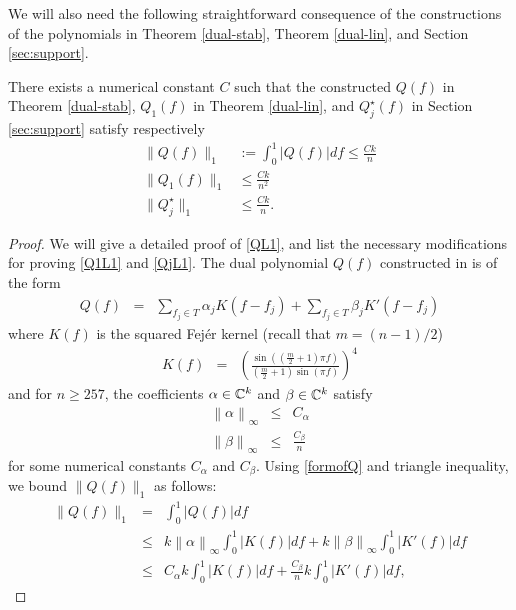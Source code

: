 We will also need the following straightforward consequence of the constructions of the polynomials in Theorem \ref{dual-stab}, Theorem \ref{dual-lin}, and Section \ref{sec:support}.
\begin{lemma}
\label{l1}
There exists a numerical constant $C$ such that the constructed $Q(f)$ in Theorem \ref{dual-stab}, $Q_1(f)$ in Theorem \ref{dual-lin}, and $Q_j^\star(f)$ in Section \ref{sec:support} satisfy respectively
\begin{align}
\|Q(f)\|_1 &:= \int_0^1{| Q(f)| df} \leq \frac{C k}{n}\label{QL1}\\
\| Q_1(f)\|_1 &\leq \frac{C k}{n^2}\label{Q1L1}\\
\|Q_j^\star\|_1 & \leq \frac{Ck}{n}\label{QjL1}.
\end{align}
\end{lemma}
\begin{proof}
We will give a detailed proof of \eqref{QL1}, and list the necessary modifications for proving \eqref{Q1L1} and \eqref{QjL1}. The dual polynomial $Q(f)$ constructed in \cite{cg_exact12} is of the
form
\begin{eqnarray}
  Q \left( f \right) & = & \sum_{f_j \in T} \alpha_j K \left( f - f_j \right)
  + \sum_{f_j \in T} \beta_j K' \left( f - f_j \right) \label{formofQ}
\end{eqnarray}
where $K \left( f \right)$ is the squared Fej\'er kernel (recall that $m = (n-1)/2$)
\begin{eqnarray*}
  K \left( f \right) & = & \left( \frac{\sin \left( \left( \frac{m}{2} + 1
  \right) \pi f \right)}{\left( \frac{m}{2} + 1 \right) \sin \left( \pi f
  \right)} \right)^4
\end{eqnarray*}
 and for $n \geq 257$, the coefficients
$\alpha \in \mathbb{C}^k$ and $\beta \in \mathbb{C}^k$ satisfy \cite[Lemma 2.2]{cg_exact12}
\begin{eqnarray*}
  \left\| \alpha \right\|_{\infty} & \leq & C_\alpha\\
  \left\| \beta \right\|_{\infty} & \leq & \frac{C_\beta}{n} 
\end{eqnarray*}
for some numerical constants $C_\alpha$ and $C_\beta$. 
Using \eqref{formofQ} and triangle inequality, we bound $\|Q(f)\|_1$ as follows: 
\begin{eqnarray}
  \|Q(f)\|_1 &=& \int_0^1 \left| Q \left( f \right) \right| d f\nonumber\\
  &\leq & k \left\| \alpha \right\|_\infty \int_0^1 \left| K \left( f\right) \right| d f + k \left\| \beta \right\|_\infty \int_0^1 \left| K' \left( f\right) \right| d f\label{Qbdgeneral1}\\
  & \leq & C_\alpha k \int_0^1 \left| K \left(f\right) \right| d f + \frac{C_\beta}{n} k \int_0^1 \left|K'(f)\right|d f \label{Q1bd},
 \end{eqnarray}
 

\end{proof}
